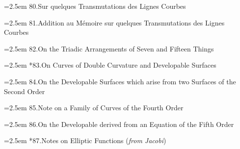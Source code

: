 \documentclass[11pt]{article}
\begin{document}
\noindent\hangindent=2.5em
80.\quad Sur quelques Transmutations des Lignes Courbes\par
\hspace{1.5em}{\small Liouville, t.~xiv.\ (1849), pp.~40--46}\par

\noindent\hangindent=2.5em
81.\quad Addition au M\'emoire sur quelques Transmutations des Lignes Courbes\par
\hspace{1.5em}{\small Liouville, t.~xv.\ (1850), pp.~351--356}\par

\noindent\hangindent=2.5em
82.\quad On the Triadic Arrangements of Seven and Fifteen Things\par
\hspace{1.5em}{\small Phil.\ Mag.\ t.~xxxvii.\ (1850), pp.~50--53}\par

\noindent\hangindent=2.5em
*83.\quad On Curves of Double Curvature and Developable Surfaces\par
\hspace{1.5em}{\small Camb.\ and Dubl.\ Math.\ Jour.\ t.~v.\ (1850), pp.~18--22}\par

\noindent\hangindent=2.5em
84.\quad On the Developable Surfaces which arise from two Surfaces of the Second Order\par
\hspace{1.5em}{\small Camb.\ and Dubl.\ Math.\ Jour.\ t.~v.\ (1850), pp.~46--57}\par

\noindent\hangindent=2.5em
85.\quad Note on a Family of Curves of the Fourth Order\par
\hspace{1.5em}{\small Camb.\ and Dubl.\ Math.\ Jour.\ t.~v.\ (1850), pp.~148--152}\par

\noindent\hangindent=2.5em
86.\quad On the Developable derived from an Equation of the Fifth Order\par
\hspace{1.5em}{\small Camb.\ and Dubl.\ Math.\ Jour.\ t.~v.\ (1850), pp.~152--159}\par

\noindent\hangindent=2.5em
*87.\quad Notes on Elliptic Functions (\textit{from Jacobi})\par
\hspace{1.5em}{\small Camb.\ and Dubl.\ Math.\ Jour.\ t.~v.\ (1850), pp.~201--204}\par
\end{document}
